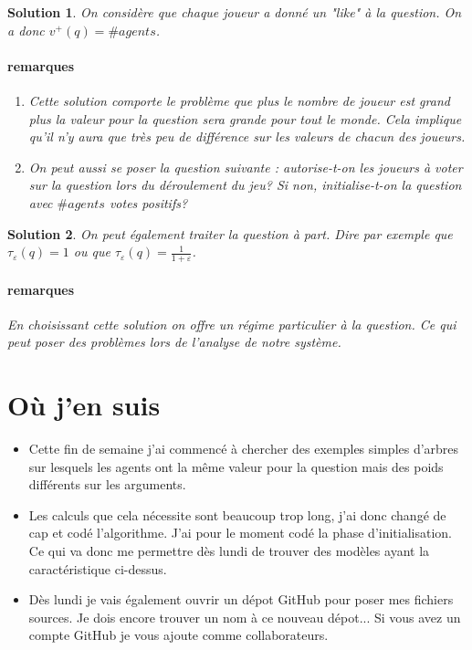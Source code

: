 \documentclass[12pt]{article}
\theoremstyle{defi}
\theoremstyle{not}
\theoremstyle{prob}
\newtheorem{solution}{Solution}
\begin{document}
\begin{solution}
  On considère que chaque joueur a donné un "like" à la question. On a donc $v^+(q) = \#agents$.

  \paragraph{remarques}
    \begin{enumerate}
      \item Cette solution comporte le problème que plus le nombre de joueur est grand plus la valeur pour la question sera grande pour tout le monde. Cela implique qu'il n'y aura que très peu de différence sur les valeurs de chacun des joueurs.

      \item On peut aussi se poser la question suivante : autorise-t-on les joueurs à voter sur la question lors du déroulement du jeu? Si non, initialise-t-on la question avec $\#agents$ votes positifs?
    \end{enumerate}
\end{solution}

\begin{solution}
  On peut également traiter la question à part. Dire par exemple que $\tau_\varepsilon(q) = 1$ ou que $\tau_\varepsilon(q) = \frac{1}{1 + \varepsilon}$.

  \paragraph{remarques}
    En choisissant cette solution on offre un régime particulier à la question. Ce qui peut poser des problèmes lors de l'analyse de notre système.
\end{solution}

\section{Où j'en suis}
\begin{itemize}
  \item Cette fin de semaine j'ai commencé à chercher des exemples simples d'arbres sur lesquels les agents ont la même valeur pour la question mais des poids différents sur les arguments.

  \item Les calculs que cela nécessite sont beaucoup trop long, j'ai donc changé de cap et codé l'algorithme. J'ai pour le moment codé la phase d'initialisation. Ce qui va donc me permettre dès lundi de trouver des modèles ayant la caractéristique ci-dessus.

  \item Dès lundi je vais également ouvrir un dépot GitHub pour poser mes fichiers sources. Je dois encore trouver un nom à ce nouveau dépot... Si vous avez un compte GitHub je vous ajoute comme collaborateurs.
\end{itemize}
\end{document}
